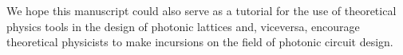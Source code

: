 \documentclass[9pt,twocolumn,twoside]{osajnl}
\begin{document}
We hope this manuscript could also serve as a tutorial for the use of theoretical physics tools in the design of photonic lattices and, viceversa, encourage theoretical physicists to make incursions on the field of photonic circuit design.










\end{document}
